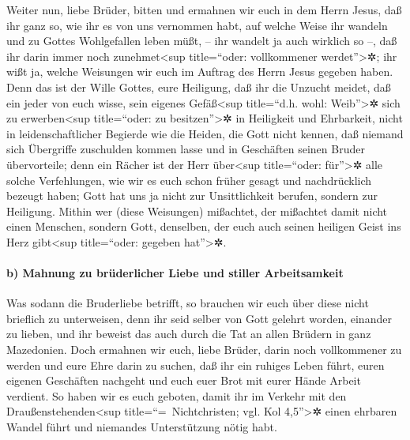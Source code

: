  Weiter nun, liebe Brüder, bitten und ermahnen wir euch in
dem Herrn Jesus, daß ihr ganz so, wie ihr es von uns vernommen habt, auf
welche Weise ihr wandeln und zu Gottes Wohlgefallen leben müßt, -- ihr
wandelt ja auch wirklich so --, daß ihr darin immer noch
zunehmet\textless sup title=``oder: vollkommener werdet''\textgreater✲;
 ihr wißt ja, welche Weisungen wir euch im Auftrag des
Herrn Jesus gegeben haben.  Denn das ist der Wille Gottes,
eure Heiligung, daß ihr die Unzucht meidet,  daß ein jeder
von euch wisse, sein eigenes Gefäß\textless sup title=``d.h. wohl:
Weib''\textgreater✲ sich zu erwerben\textless sup title=``oder: zu
besitzen''\textgreater✲ in Heiligkeit und Ehrbarkeit, 
nicht in leidenschaftlicher Begierde wie die Heiden, die Gott nicht
kennen,  daß niemand sich Übergriffe zuschulden kommen
lasse und in Geschäften seinen Bruder übervorteile; denn ein Rächer ist
der Herr über\textless sup title=``oder: für''\textgreater✲ alle solche
Verfehlungen, wie wir es euch schon früher gesagt und nachdrücklich
bezeugt haben;  Gott hat uns ja nicht zur Unsittlichkeit
berufen, sondern zur Heiligung.  Mithin wer (diese
Weisungen) mißachtet, der mißachtet damit nicht einen Menschen, sondern
Gott, denselben, der euch auch seinen heiligen Geist ins Herz
gibt\textless sup title=``oder: gegeben hat''\textgreater✲.

\hypertarget{b-mahnung-zu-bruxfcderlicher-liebe-und-stiller-arbeitsamkeit}{%
\paragraph{b) Mahnung zu brüderlicher Liebe und stiller
Arbeitsamkeit}\label{b-mahnung-zu-bruxfcderlicher-liebe-und-stiller-arbeitsamkeit}}

 Was sodann die Bruderliebe betrifft, so brauchen wir euch
über diese nicht brieflich zu unterweisen, denn ihr seid selber von Gott
gelehrt worden, einander zu lieben,  und ihr beweist das
auch durch die Tat an allen Brüdern in ganz Mazedonien. Doch ermahnen
wir euch, liebe Brüder, darin noch vollkommener zu werden
 und eure Ehre darin zu suchen, daß ihr ein ruhiges Leben
führt, euren eigenen Geschäften nachgeht und euch euer Brot mit eurer
Hände Arbeit verdient. So haben wir es euch geboten, 
damit ihr im Verkehr mit den Draußenstehenden\textless sup
title=``=~Nichtchristen; vgl. Kol 4,5''\textgreater✲ einen ehrbaren
Wandel führt und niemandes Unterstützung nötig habt.

